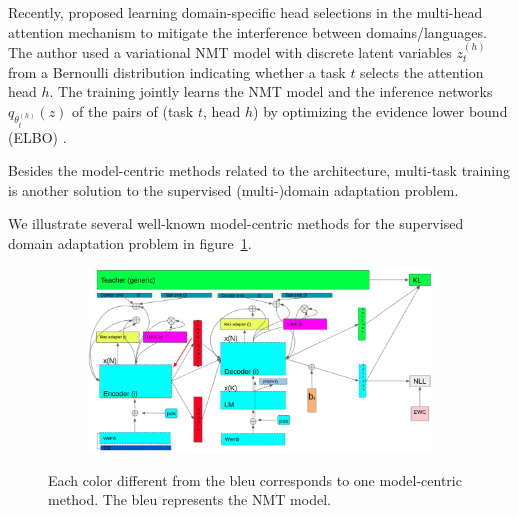 Recently, \citet{Gong21Pay} proposed learning domain-specific head selections in the multi-head attention mechanism to mitigate the interference between domains/languages. The author used a variational NMT model with discrete latent variables $z^{(h)}_t$ from a Bernoulli distribution indicating whether a task $t$ selects the attention head $h$. The training jointly learns the NMT model and the inference networks $q_{\theta^{(h)}_t}(z)$ of the pairs of (task $t$, head $h$) by optimizing the evidence lower bound (ELBO) \cite{zhang16variational}.

Besides the model-centric methods related to the architecture, multi-task training is another solution to the supervised (multi-)domain adaptation problem. 

We illustrate several well-known model-centric methods for the supervised domain adaptation problem in figure~\ref{fig:model-centric-case1-case2}.
\begin{figure}[htbp]
\begin{subfigure}{1.0\textwidth}
  \centering
  \includegraphics[width=1.0\textwidth]{graphics/supervised_mdmt}
\end{subfigure}
\newline
\begin{subfigure}{1.0\textwidth}
  \centering
\end{subfigure}
\caption[Model-centric's brief overview]{Each color different from the bleu corresponds to one model-centric method. The bleu represents the NMT model.}
\label{fig:model-centric-case1-case2}
\end{figure}

